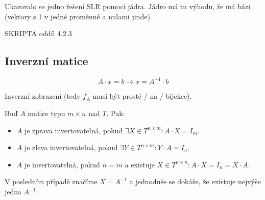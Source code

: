 \documentclass[12pt]{article}					%
\begin{document}
        \begin{priklad}
            Ukazovalo se jedno řešení SLR pomocí jádra. Jádro má tu výhodu, že má bázi (vektory s 1 v jedné proměnné a nulami jinde).
        \end{priklad}

        \begin{definice}
            SKRIPTA oddíl 4.2.3
        \end{definice}


    \subsection{Inverzní matice}

        \begin{poznamka}[Motivace]
            $$ A·x = b \rightarrow x = A^{-1}·b $$

            Inverzní zobrazení (tedy $f_A$ musí být prosté / na / bijekce).
        \end{poznamka}

        \begin{definice}[]
            Buď $A$ matice typu $m\times n$ nad $T$. Pak:
            \begin{itemize}
                \item $A$ je zprava invertovatelná, pokud $\exists X \in T^{n \times m}: A·X = I_m$.
                \item $A$ je zleva invertovatelná, pokud $\exists Y \in T^{n\times m}: Y·A = I_n$.
                \item $A$ je invertovatelná, pokud $n = m$ a existuje $X \in T^{n\times n}: A·X = I_n = X·A$.
            \end{itemize}
            
            \begin{poznamkain}
                V posledním případě značíme $X = A^{-1}$ a jednoduše se dokáže, že existuje nejvýše jedna $A^{-1}$.
            \end{poznamkain}
        \end{definice}
\end{document}
